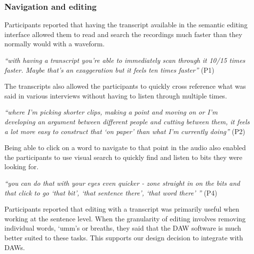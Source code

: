 


\subsubsection{Navigation and editing}
Participants reported that having the transcript available in the semantic editing interface allowed them to read and
search the recordings much faster than they normally would with a waveform.

\textit{``with having a transcript you're able to immediately scan through it 10/15 times faster. Maybe that's an
  exaggeration but it feels ten times faster''} (P1)

The transcripts also allowed the participants to quickly cross reference what was said in various interviews without
having to listen through multiple times.

\textit{``where I'm picking shorter clips, making a point and moving on or I'm developing an argument between different
  people and cutting between them, it feels a lot more easy to construct that `on paper' than what I'm currently
  doing''} (P2)


Being able to click on a word to navigate to that point in the audio also enabled the participants to use visual search
to quickly find and listen to bits they were looking for.

\textit{``you can do that with your eyes even quicker - zone straight in on the bits and that click to go  `that bit',
  `that sentence there', `that word there' ''} (P4)

Participants reported that editing with a transcript was primarily useful when working at the sentence level. When the
granularity of editing involves removing individual words, `umm's or breaths, they said that the DAW software is much
better suited to these tasks. This supports our design decision to integrate with DAWs.

